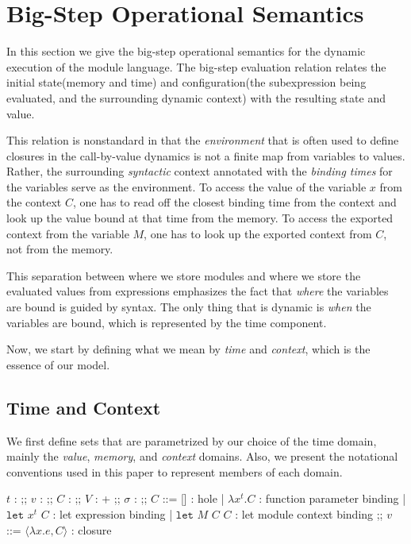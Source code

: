 \documentclass{article}
\theoremstyle{definition}
\newcommand*{\Time}{\mathbb{T}}
\newcommand*{\Ctx}[1]{\text{Ctx}\:{#1}}
\newcommand*{\Value}[1]{\text{Val}\:{#1}}
\newcommand*{\Mem}[1]{\text{Mem}\:{#1}}
\newcommand*{\fin}[2]{{#1}\xrightarrow{\text{fin}}{#2}}
\newcommand*{\Let}{\mathtt{let}}
\begin{document}
\section{Big-Step Operational Semantics}

In this section we give the big-step operational semantics for the dynamic execution of the module language.
The big-step evaluation relation relates the initial state(memory and time) and configuration(the subexpression being evaluated, and the surrounding dynamic context) with the resulting state and value.

This relation is nonstandard in that the \emph{environment} that is often used to define closures in the call-by-value dynamics is not a finite map from variables to values.
Rather, the surrounding \emph{syntactic} context annotated with the \emph{binding times} for the variables serve as the environment.
To access the value of the variable $x$ from the context $C$, one has to read off the closest binding time from the context and look up the value bound at that time from the memory.
To access the exported context from the variable $M$, one has to look up the exported context from $C$, not from the memory.

This separation between where we store modules and where we store the evaluated values from expressions emphasizes the fact that \emph{where} the variables are bound is guided by syntax.
The only thing that is dynamic is \emph{when} the variables are bound, which is represented by the time component.

Now, we start by defining what we mean by \emph{time} and \emph{context}, which is the essence of our model.

\subsection{Time and Context}

We first define sets that are parametrized by our choice of the time domain, mainly the \emph{value}, \emph{memory}, and \emph{context} domains.
Also, we present the notational conventions used in this paper to represent members of each domain.

\begin{bnfgrammar}
  $t$ : \in \Time
  ;;
  $v$ : \in \Value{\Time}
  ;;
  $C$ : \in \Ctx{\Time}
  ;;
  $V$ : \in \Value{\Time}+\Ctx{\Time}
  ;;
  $\sigma$ : \in \Mem{\Time} \triangleq \fin{\Time}{\Value{\Time}}
  ;;
  $C$ ::= [] : hole
  | $\lambda x^{t}.C$ : function parameter binding
  | $\Let$ $x^{t}$ $C$ : let expression binding
  | $\Let$ $M$ $C$ $C$ : let module context binding
  ;;
  $v$ ::= $\langle \lambda x.e, C \rangle$ : closure
\end{bnfgrammar}
\end{document}
